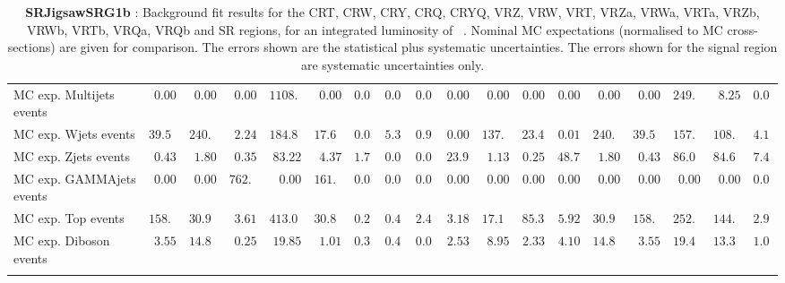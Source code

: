 \begin{table}
{\begin{tabular*}{\textwidth}{@{\extracolsep{\fill}}lrrrrrrrrrrrrrrrrr}
\noalign{\smallskip}\hline\noalign{\smallskip}
        MC exp. Multijets events         & $0.00$          & $0.00$          & $0.00$          & $1108.81$          & $0.00$          & $0.00$          & $0.00$          & $0.00$          & $0.00$          & $0.00$          & $0.00$          & $0.00$          & $0.00$          & $0.00$          & $249.74$          & $8.25$          & $0.00$              \\
        MC exp. Wjets events         & $39.55$          & $240.00$          & $2.24$          & $184.87$          & $17.61$          & $0.00$          & $5.37$          & $0.94$          & $0.00$          & $137.91$          & $23.43$          & $0.01$          & $240.00$          & $39.55$          & $157.04$          & $108.54$          & $4.14$              \\
        MC exp. Zjets events         & $0.43$          & $1.80$          & $0.35$          & $83.22$          & $4.37$          & $1.72$          & $0.04$          & $0.01$          & $23.95$          & $1.13$          & $0.25$          & $48.79$          & $1.80$          & $0.43$          & $86.06$          & $84.69$          & $7.42$              \\
        MC exp. GAMMAjets events         & $0.00$          & $0.00$          & $762.10$          & $0.00$          & $161.56$          & $0.00$          & $0.00$          & $0.00$          & $0.00$          & $0.00$          & $0.00$          & $0.00$          & $0.00$          & $0.00$          & $0.00$          & $0.00$          & $0.00$              \\
        MC exp. Top events         & $158.85$          & $30.96$          & $3.61$          & $413.01$          & $30.83$          & $0.22$          & $0.40$          & $2.47$          & $3.18$          & $17.10$          & $85.37$          & $5.92$          & $30.96$          & $158.85$          & $252.23$          & $144.05$          & $2.90$              \\
        MC exp. Diboson events         & $3.55$          & $14.86$          & $0.25$          & $19.85$          & $1.01$          & $0.30$          & $0.40$          & $0.06$          & $2.53$          & $8.95$          & $2.33$          & $4.10$          & $14.86$          & $3.55$          & $19.40$          & $13.30$          & $1.08$              \\
\noalign{\smallskip}\hline\noalign{\smallskip}
\end{tabular*}
}
\caption{{\bf SRJigsawSRG1b} : Background fit results for the CRT, CRW, CRY, CRQ, CRYQ, VRZ, VRW, VRT, VRZa, VRWa, VRTa, VRZb, VRWb, VRTb, VRQa, VRQb and SR regions, for an integrated luminosity of \ourintlumi~\ifb. Nominal MC expectations (normalised to MC cross-sections) are given for comparison. The errors shown are the statistical plus systematic uncertainties. The errors shown for the signal region are systematic uncertainties only.}
\label{table.results.systematics.in.logL.fit.CRT.CRW.CRY.CRQ.CRYQ.VRZ.VRW.VRT.VRZa.VRWa.VRTa.VRZb.VRWb.VRTb.VRQa.VRQb.SR.SRJigsawSRG1b}
\end{table}
%